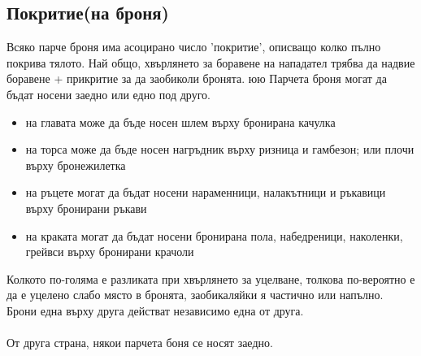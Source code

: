 \subsection{Покритие(на броня)}
Всяко парче броня има асоцирано число 'покритие', описващо колко пълно покрива тялото.
Най общо, хвърлянето за боравене на нападател трябва да надвие боравене + прикритие за да заобиколи бронята. 
юю
Парчета броня могат да бъдат носени заедно или едно под друго.
\begin{itemize}
\item{на главата може да бъде носен шлем върху бронирана качулка}
\item{на торса може да бъде носен нагръдник върху ризница и гамбезон; или плочи върху бронежилетка}
\item{на ръцете могат да бъдат носени нараменници, налакътници и ръкавици върху бронирани ръкави}
\item{на краката могат да бъдат носени бронирана пола, набедреници, наколенки, грейвси върху бронирани крачоли}
\end{itemize}

Колкото по-голяма е разликата при хвърлянето за уцелване, толкова по-вероятно е да е уцелено слабо място в бронята, заобикаляйки я частично или напълно.
Брони една върху друга действат независимо една от друга.
\\
\\
От друга страна, някои парчета боня се носят заедно.
\\


